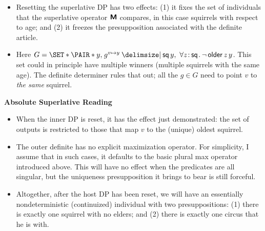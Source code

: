 \documentclass[10pt,fleqn]{article}
\newcommand{\M}{\text{\sffamily\bfseries M}}
\begin{document}
\begin{minipage}[t]{0.5\textwidth} %
  \begin{itemize}
    \item
      Resetting the superlative DP has two effects: (1) it fixes the set of
      individuals that the superlative operator $\M$ compares, in this case
      squirrels with respect to age; and (2) it freezes the presupposition
      associated with the definite article.
    \item
      Here $G = \set{\pair{y}{g^{v\mapsto y}} \giv \cn{sq}\,y,\ \forall
      z\col\cn{sq} \dt \neg\,\cn{older}\,z\,y}$. This set could in principle
      have multiple winners (multiple squirrels with the same age). The definite
      determiner rules that out; all the $g \in G$ need to point $v$ to
      \emph{the same} squirrel.
  \end{itemize}
  \vspace{4em}
  \textbf{Absolute Superlative Reading}
  \begin{itemize}
    \item
      When the inner DP is reset, it has the effect just demonstrated: the set
      of outputs is restricted to those that map $v$ to the (unique) oldest
      squirrel.
    \item
      The outer definite has no explicit maximization operator. For
      simplicity, I assume that in such cases, it defaults to the basic plural
      max operator introduced above. This will have no effect when the
      predicates are all singular, but the uniqueness presupposition it brings
      to bear is still forceful.
    \item
      Altogether, after the host DP has been reset, we will have an
      essentially nondeterministic (continuized) individual with two
      presuppositions: (1) there is exactly one squirrel with no elders; and (2)
      there is exactly one circus that he is with.
  \end{itemize}
\end{minipage}

\newpage
\end{document}
